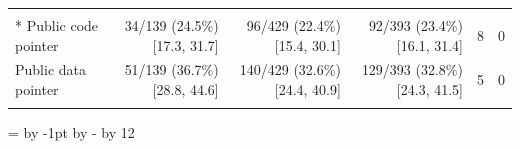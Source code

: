 \begin{table}[tp]
{\begin{tabular}{lrrrrr}
\addlinespace[1.5pt]
\rowcolor{ebAmber!45}\multicolumn{6}{l}{\textbf{\itshape Artifact pointers}} \\*
Public code pointer & 34/139 (24.5\%) \textcolor{black!60}{[17.3, 31.7]} & 96/429 (22.4\%) \textcolor{black!60}{[15.4, 30.1]} & 92/393 (23.4\%) \textcolor{black!60}{[16.1, 31.4]} & 8 & 0 \\
\addlinespace[1.5pt]
Public data pointer & 51/139 (36.7\%) \textcolor{black!60}{[28.8, 44.6]} & 140/429 (32.6\%) \textcolor{black!60}{[24.4, 40.9]} & 129/393 (32.8\%) \textcolor{black!60}{[24.3, 41.5]} & 5 & 0 \\
\addlinespace[1.5pt]
\bottomrule
\end{tabular}}
\setlength{\tabcolsep}{0pt}
=\linewidth\advance{} by -1pt\advance{} by -\divide{} by 12
\ifdim\dimen0<1.5pt \dimen0=1.5pt\fi
\setlength{\tabcolsep}{\dimen0}\familytab
\end{table}
\endgroup
